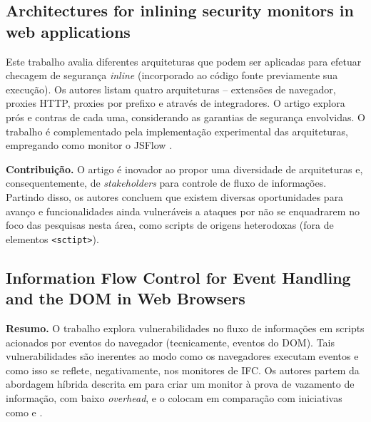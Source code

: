 \subsection{Architectures for inlining security monitors in web applications \cite{Magazinius2014}}
Este trabalho avalia diferentes arquiteturas que podem ser aplicadas para efetuar checagem de segurança \textit{inline} (incorporado ao código fonte previamente sua execução). Os autores listam quatro arquiteturas -- extensões de navegador, proxies HTTP, proxies por prefixo e através de integradores.
O artigo explora prós e contras de cada uma, considerando as garantias de segurança envolvidas. O trabalho é complementado pela implementação experimental das arquiteturas, empregando como monitor o JSFlow \cite{Hedin2014}.

\textbf{Contribuição.} O artigo é inovador ao propor uma diversidade de arquiteturas e, consequentemente, de \textit{stakeholders} para controle de fluxo de informações. Partindo disso, os autores concluem que existem diversas oportunidades para avanço e funcionalidades ainda vulneráveis a ataques por não se enquadrarem no foco das pesquisas nesta área, como scripts de origens heterodoxas (fora de elementos \texttt{<sctipt>}).


\subsection{Information Flow Control for Event Handling and the DOM in Web Browsers \cite{Rajani2015}}
\textbf{Resumo.} O trabalho explora vulnerabilidades no fluxo de informações em scripts acionados por eventos do navegador (tecnicamente, eventos do DOM). Tais vulnerabilidades são inerentes ao modo como os navegadores executam eventos e como isso se reflete, negativamente, nos monitores de IFC. Os autores partem da abordagem híbrida descrita em \cite{Bichhawat2014} para criar um monitor à prova de vazamento de informação, com baixo \textit{overhead}, e o colocam em comparação com iniciativas como \cite{Stefan2014} e \cite{Hedin2014}.
